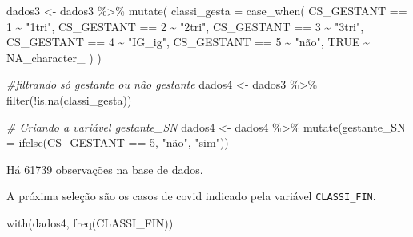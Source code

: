 \documentclass[
]{article}
\newenvironment{Shaded}{\begin{snugshade}}{\end{snugshade}}
\newcommand{\AttributeTok}[1]{\textcolor[rgb]{0.77,0.63,0.00}{#1}}
\newcommand{\CommentTok}[1]{\textcolor[rgb]{0.56,0.35,0.01}{\textit{#1}}}
\newcommand{\ConstantTok}[1]{\textcolor[rgb]{0.00,0.00,0.00}{#1}}
\newcommand{\DecValTok}[1]{\textcolor[rgb]{0.00,0.00,0.81}{#1}}
\newcommand{\FunctionTok}[1]{\textcolor[rgb]{0.00,0.00,0.00}{#1}}
\newcommand{\NormalTok}[1]{#1}
\newcommand{\OtherTok}[1]{\textcolor[rgb]{0.56,0.35,0.01}{#1}}
\newcommand{\SpecialCharTok}[1]{\textcolor[rgb]{0.00,0.00,0.00}{#1}}
\newcommand{\StringTok}[1]{\textcolor[rgb]{0.31,0.60,0.02}{#1}}
\begin{document}
\begin{Shaded}
\begin{Highlighting}[]
\NormalTok{dados3 }\OtherTok{\textless{}{-}}\NormalTok{ dados3 }\SpecialCharTok{\%\textgreater{}\%}
  \FunctionTok{mutate}\NormalTok{(}
    \AttributeTok{classi\_gesta =} \FunctionTok{case\_when}\NormalTok{(}
\NormalTok{      CS\_GESTANT }\SpecialCharTok{==} \DecValTok{1}  \SpecialCharTok{\textasciitilde{}} \StringTok{"1tri"}\NormalTok{,}
\NormalTok{      CS\_GESTANT }\SpecialCharTok{==} \DecValTok{2}  \SpecialCharTok{\textasciitilde{}} \StringTok{"2tri"}\NormalTok{,}
\NormalTok{      CS\_GESTANT }\SpecialCharTok{==} \DecValTok{3}  \SpecialCharTok{\textasciitilde{}} \StringTok{"3tri"}\NormalTok{,}
\NormalTok{      CS\_GESTANT }\SpecialCharTok{==} \DecValTok{4}  \SpecialCharTok{\textasciitilde{}} \StringTok{"IG\_ig"}\NormalTok{,}
\NormalTok{      CS\_GESTANT }\SpecialCharTok{==} \DecValTok{5}  \SpecialCharTok{\textasciitilde{}} \StringTok{"não"}\NormalTok{,}
      \ConstantTok{TRUE} \SpecialCharTok{\textasciitilde{}} \ConstantTok{NA\_character\_}
\NormalTok{    )}
\NormalTok{  )}

\CommentTok{\#filtrando só gestante ou não gestante}
\NormalTok{dados4 }\OtherTok{\textless{}{-}}\NormalTok{ dados3 }\SpecialCharTok{\%\textgreater{}\%} 
  \FunctionTok{filter}\NormalTok{(}\SpecialCharTok{!}\FunctionTok{is.na}\NormalTok{(classi\_gesta))}


\CommentTok{\# Criando a variável gestante\_SN}
\NormalTok{dados4 }\OtherTok{\textless{}{-}}\NormalTok{ dados4 }\SpecialCharTok{\%\textgreater{}\%}
  \FunctionTok{mutate}\NormalTok{(}\AttributeTok{gestante\_SN =} \FunctionTok{ifelse}\NormalTok{(CS\_GESTANT }\SpecialCharTok{==} \DecValTok{5}\NormalTok{, }\StringTok{"não"}\NormalTok{, }\StringTok{"sim"}\NormalTok{))}
\end{Highlighting}
\end{Shaded}

Há 61739 observações na base de dados.

A próxima seleção são os casos de covid indicado pela variável
\texttt{CLASSI\_FIN}.

\begin{Shaded}
\begin{Highlighting}[]
\FunctionTok{with}\NormalTok{(dados4, }\FunctionTok{freq}\NormalTok{(CLASSI\_FIN))}
\end{Highlighting}
\end{Shaded}
\end{document}
